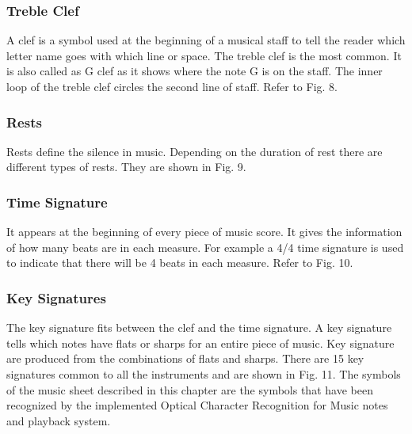 \documentclass[journal]{IEEEtran}
\begin{document}
\subsubsection{Treble Clef}
A clef is a symbol used at the beginning of a musical staff to tell the reader which letter name
goes with which line or space. The treble clef is the most common. It is also called as G clef as it
shows where the note G is on the staff. The inner loop of the treble clef circles the second line of
staff. Refer to Fig. 8.

\subsubsection{Rests}
Rests define the silence in music. Depending on the duration of rest there are different types of
rests. They are shown in Fig. 9.

\subsubsection{Time Signature}
It appears at the beginning of every piece of music score. It gives the information of how many
beats are in each measure.
For example a 4/4 time signature is used to indicate that there will be 4 beats in each measure. Refer to Fig. 10.

\subsubsection{Key Signatures}
The key signature fits between the clef and the time signature. A key signature tells which notes
have flats or sharps for an entire piece of music. Key signature are produced from the combinations
of flats and sharps. There are 15 key signatures common to all the instruments and are shown in
Fig. 11. The symbols of the music sheet described in this chapter are the symbols that have been recognized by the implemented Optical Character Recognition for Music notes and playback system.




%
%
\end{document}

